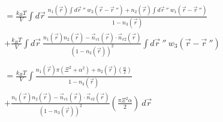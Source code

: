 \documentclass[double,12pt]{beavtex}
\begin{document}
\begin{align} %
          &= \frac{k_BT}{V} \int d\vec r~ \frac{n_1(\vec r)\int d \vec r~''
           ~w_2(\vec r - \vec r~'')
          +n_2(\vec r)\int d \vec r~'' ~w_1(\vec r - \vec r~'')}
          {1-n_3(\vec r)} \nonumber\\
          &+\frac{k_BT}{V} \int d\vec r~\frac{n_1(\vec r)n_2(\vec r)
          -\vec n_{v1}(\vec r)
          \cdot \vec n_{v2}(\vec r)}{(1-n_3(\vec r))^2} \int d \vec r~'' 
          ~w_3(\vec r - \vec r~'') \\ \nonumber \\
%
           &= \frac{k_BT}{V}\int  \frac{n_1(\vec r)
           \pi(\Xi^2 + \alpha^2)
          +n_2(\vec r)\left(\frac{\alpha}{2}\right)}{1-n_3(\vec r)} 
          \nonumber \\
          &+ \frac{n_1(\vec r)n_2(\vec r)
          -\vec n_{v1}(\vec r)
          \cdot \vec n_{v2}(\vec r)}{(1-n_3(\vec r))^2}
          \left(\frac{\pi\Xi^2\alpha}{2}\right)   ~d\vec r
\end{align}
\end{document}
